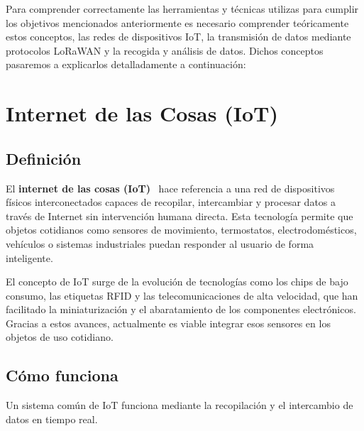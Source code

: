 
Para comprender correctamente las herramientas y técnicas utilizas para cumplir los objetivos mencionados anteriormente es necesario comprender teóricamente estos conceptos, las redes de dispositivos IoT, la transmisión de datos mediante protocolos LoRaWAN y la recogida y análisis de datos. Dichos conceptos pasaremos a explicarlos detalladamente a continuación:



\section{Internet de las Cosas (IoT)}
\subsection{Definición}
El \textbf{internet de las cosas (IoT)}~\cite{aws:iot} hace referencia a una red de dispositivos físicos interconectados capaces de recopilar, intercambiar y procesar datos a través de Internet sin intervención humana directa. Esta tecnología permite que objetos cotidianos como sensores de movimiento, termostatos, electrodomésticos, vehículos o sistemas industriales puedan responder al usuario de forma inteligente.

El concepto de IoT surge de la evolución de tecnologías como los chips de bajo consumo, las etiquetas RFID y las telecomunicaciones de alta velocidad, que han facilitado la miniaturización y el abaratamiento de los componentes electrónicos. Gracias a estos avances, actualmente es viable integrar esos sensores en los objetos de uso cotidiano.
\subsection{Cómo funciona}
Un sistema común de IoT funciona mediante la recopilación y el intercambio de datos en tiempo real. 

